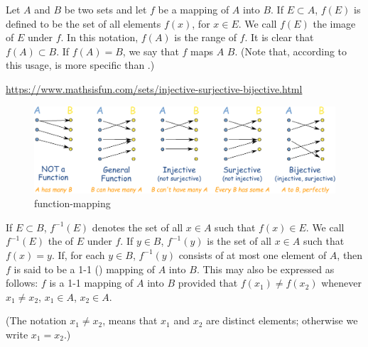 \begin{mydef}
    \label{mydef:2.2}
    Let $A$ and $B$ be two sets and let $f$ be a mapping of $A$ into $B$.
    If $E \subset A$, $f(E)$ is defined to be the set of all elements $f(x)$, for $x \in E$. We call $f(E)$ the image of $E$ under $f$. In this notation, $f(A)$ is the range of $f$. It is clear that $f(A) \subset B$. If $f(A) = B$, we say that $f$ maps $A$  $B$. (Note that, according
    to this usage,  is more specific than .)
    
    \url{https://www.mathsisfun.com/sets/injective-surjective-bijective.html}
    \begin{figure}[htbp]
        \centering
        \includegraphics[width=0.7\linewidth]{pic/function-mapping.pdf}
        \caption{function-mapping}
        \label{fig:function-mapping}
    \end{figure}

    If $E \subset B$, $f^{-1}(E)$ denotes the set of all $x \in A$ such that $f(x)\in E$. We call $f^{-1}(E)$ the  of $E$ under $f$. If $y \in B$, $f^{-1}(y)$ is the set of all $x \in A$ such that $f(x) =y$. If, for each $y\in B$, $f^{-1}(y)$ consists of at most one element of $A$, then $f$ is said to be a 1-1 () mapping of $A$ into $B$. This may also be expressed as follows: $f$ is a 1-1 mapping of $A$ into $B$ provided that $f(x_1) \neq f(x_2)$ whenever $x_1 \neq x_2$, $x_1 \in A$, $x_2 \in A$.

    (The notation $x_1 \neq x_2$, means that $x_1$ and $x_2$ are distinct elements; otherwise we write $x_1 = x_2$.)
\end{mydef}

